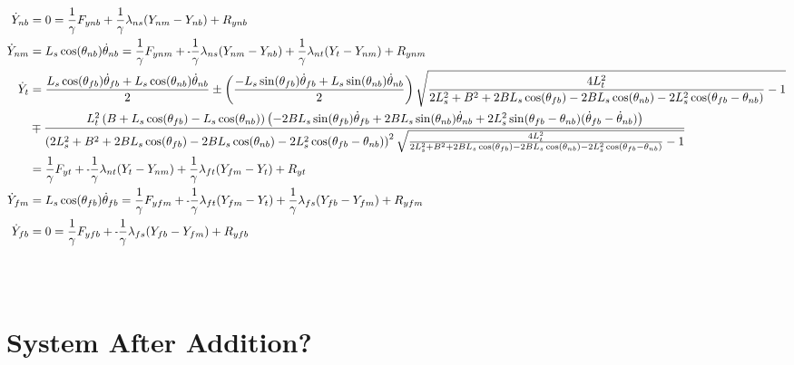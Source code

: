 \documentclass[11pt, landscape]{article}
\newcommand{\mn}{\scalebox{0.7}[1.0]{-}}
\begin{document}
\begin{align}
  \dot{Y}_{nb} &= 0 = \frac{1}{\gamma}F_{ynb} + \frac{1}{\gamma}\lambda_{ns}(Y_{nm} - Y_{nb}) + R_{ynb} \\
  \dot{Y}_{nm} &= L_s\cos(\theta_{nb})\dot{\theta}_{nb} = \frac{1}{\gamma}F_{ynm} + \mn\frac{1}{\gamma}\lambda_{ns}(Y_{nm} - Y_{nb}) + \frac{1}{\gamma}\lambda_{nt}(Y_{t } - Y_{nm}) + R_{ynm} \\
  \dot{Y}_{t}  &= \frac{L_s\cos(\theta_{fb})\dot{\theta}_{fb} + L_s\cos(\theta_{nb})\dot{\theta}_{nb}}{2} \pm \left(\frac{-L_s\sin(\theta_{fb})\dot{\theta}_{fb} + L_s\sin(\theta_{nb})\dot{\theta}_{nb}}{2}\right)\sqrt{\frac{4L_t^2}{2L_s^2 + B^2 + 2BL_s\cos(\theta_{fb}) -2BL_s\cos(\theta_{nb}) - 2L_s^2\cos(\theta_{fb} - \theta_{nb})} - 1}\\
  &\mp \frac{L_t^2\left(B + L_s\cos(\theta_{fb}) - L_s\cos(\theta_{nb})\right)\left(-2BL_s\sin(\theta_{fb})\dot{\theta}_{fb} + 2BL_s\sin(\theta_{nb})\dot{\theta}_{nb} + 2L_s^2\sin(\theta_{fb} - \theta_{nb})(\dot{\theta}_{fb} - \dot{\theta}_{nb})\right)}{\left(2L_s^2 + B^2 + 2BL_s\cos(\theta_{fb}) -2BL_s\cos(\theta_{nb}) - 2L_s^2\cos(\theta_{fb} - \theta_{nb})\right)^2\sqrt{\frac{4L_t^2}{2L_s^2 + B^2 + 2BL_s\cos(\theta_{fb}) -2BL_s\cos(\theta_{nb}) - 2L_s^2\cos(\theta_{fb} - \theta_{nb})} - 1}}\\ &= \frac{1}{\gamma}F_{yt } + \mn\frac{1}{\gamma}\lambda_{nt}(Y_{t } - Y_{nm}) + \frac{1}{\gamma}\lambda_{ft}(Y_{fm} - Y_{t }) + R_{yt } \\
  \dot{Y}_{fm} &= L_s\cos(\theta_{fb})\dot{\theta}_{fb} = \frac{1}{\gamma}F_{yfm} + \mn\frac{1}{\gamma}\lambda_{ft}(Y_{fm} - Y_{t }) + \frac{1}{\gamma}\lambda_{fs}(Y_{fb} - Y_{fm}) + R_{yfm} \\
  \dot{Y}_{fb} &= 0 = \frac{1}{\gamma}F_{yfb} + \mn\frac{1}{\gamma}\lambda_{fs}(Y_{fb} - Y_{fm}) + R_{yfb}
\end{align} \\ \\

\section{System After Addition?}
\end{document}

